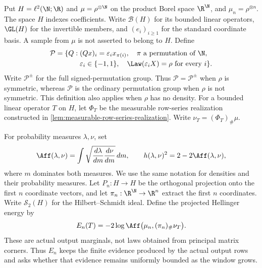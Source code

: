 Put \(H=\ell^2(\N;\R)\) and
\(\mu=\rho^{\otimes\N}\) on the product Borel space \(\R^{\N}\),
and \(\mu_n=\rho^{\otimes n}\).  The
space \(H\) indexes coefficients.  Write \(\mathcal B(H)\) for its
bounded linear operators, \(\GL(H)\) for the invertible members, and
\((e_i)_{i\ge1}\) for the standard coordinate basis.
A sample from \(\mu\) is not asserted to belong to \(H\).
Define
\begin{equation}
 \begin{aligned}
 \mathcal P=\{Q:{}&(Qx)_i=\varepsilon_i x_{\pi(i)},\quad
       \pi\text{ a permutation of }\N,\\
       &\varepsilon_i\in\{-1,1\},\quad\Law(\varepsilon_iX)=\rho
       \text{ for every }i\}.
 \end{aligned}
 \label{eq:allowed-permutations}
\end{equation}
Write \(\mathcal P^{\pm}\) for the full signed-permutation group.
Thus \(\mathcal P=\mathcal P^{\pm}\) when \(\rho\) is symmetric, whereas
\(\mathcal P\) is the ordinary permutation group when \(\rho\) is not
symmetric.
This definition also applies when \(\rho\) has no density.
For a bounded linear operator \(T\) on \(H\), let \(\Phi_T\) be the
measurable row-series realization
constructed in \cref{lem:measurable-row-series-realization}.
Write \(\nu_T=(\Phi_T)_\#\mu\).

For probability measures \(\lambda,\nu\), set
\begin{equation}
 \Aff(\lambda,\nu)
 =\int\sqrt{\frac{d\lambda}{dm}\frac{d\nu}{dm}}\,dm,
 \qquad
 h(\lambda,\nu)^2=2-2\Aff(\lambda,\nu),
 \label{eq:affinity-convention}
\end{equation}
where \(m\) dominates both measures.  We use the same notation for
densities and their probability measures.  Let \(P_n:H\to H\) be the
orthogonal projection onto the first \(n\) coordinate vectors, and let
\(\pi_n:\R^{\N}\to\R^n\) extract the first \(n\) coordinates.
Write \(\mathcal S_2(H)\) for the Hilbert--Schmidt ideal.  Define the
projected Hellinger energy by
\begin{equation}
 E_n(T)=-2\log\Aff\bigl(\mu_n,(\pi_n)_\#\nu_T\bigr).
 \label{eq:projected-hellinger-energy}
\end{equation}
These are actual output marginals, not laws obtained from principal matrix
corners.  Thus \(E_n\) keeps the finite evidence produced by the actual
output rows and asks whether that evidence remains uniformly bounded
as the window grows.

